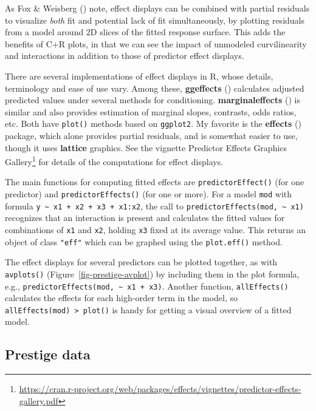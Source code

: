 \documentclass[
  letterpaper,
  10pt,
  krantz2]{krantz}
\providecommand{\href}[2]{#2\footnote{\url{#1}}}
\begin{document}
As Fox \& Weisberg () note, effect
displays can be combined with partial residuals to visualize \emph{both}
fit and potential lack of fit simultaneously, by plotting residuals from
a model around 2D slices of the fitted response surface. This adds the
benefits of C+R plots, in that we can see the impact of unmodeled
curvilinearity and interactions in addition to those of predictor effect
displays.

There are several implementations of effect displays in R, whose
details, terminology and ease of use vary. Among these,
\textbf{ggeffects} ()
calculates adjusted predicted values under several methods for
conditioning. \textbf{marginaleffects}
() is
similar and also provides estimation of marginal slopes, contrasts, odds
ratios, etc. Both have \texttt{plot()} methods based on
\texttt{ggplot2}. My favorite is the \textbf{effects}
() package, which alone
provides partial residuals, and is somewhat easier to use, though it
uses \textbf{lattice} graphics. See the vignette
\href{https://cran.r-project.org/web/packages/effects/vignettes/predictor-effects-gallery.pdf}{Predictor
Effects Graphics Gallery} for details of the computations for effect
displays.

The main functions for computing fitted effects are
\texttt{predictorEffect()} (for one predictor) and
\texttt{predictorEffects()} (for one or more). For a model \texttt{mod}
with formula \texttt{y\ \textasciitilde{}\ x1\ +\ x2\ +\ x3\ +\ x1:x2},
the call to \texttt{predictorEffects(mod,\ \textasciitilde{}\ x1)}
recognizes that an interaction is present and calculates the fitted
values for combinations of \texttt{x1} and \texttt{x2}, holding
\texttt{x3} fixed at its average value. This returns an object of class
\texttt{"eff"} which can be graphed using the \texttt{plot.eff()}
method.

The effect displays for several predictors can be plotted together, as
with \texttt{avplots()} (Figure~\ref{fig-prestige-avplot}) by including
them in the plot formula, e.g.,
\texttt{predictorEffects(mod,\ \textasciitilde{}\ x1\ +\ x3)}. Another
function, \texttt{allEffects()} calculates the effects for each
high-order term in the model, so
\texttt{allEffects(mod)\ \textbar{}\textgreater{}\ plot()} is handy for
getting a visual overview of a fitted model.

\subsection{Prestige data}\label{prestige-data-1}
\end{document}
